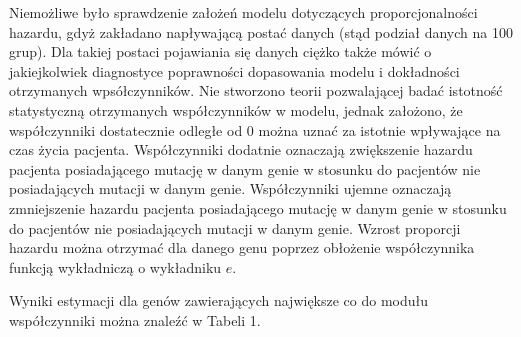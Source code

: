 \documentclass[]{article}
\begin{document}
Niemożliwe było sprawdzenie założeń modelu dotyczących proporcjonalności
hazardu, gdyż zakładano napływającą postać danych (stąd podział danych
na 100 grup). Dla takiej postaci pojawiania się danych ciężko także
mówić o jakiejkolwiek diagnostyce poprawności dopasowania modelu i
dokładności otrzymanych wpsółczynników. Nie stworzono teorii
pozwalającej badać istotność statystyczną otrzymanych współczynników w
modelu, jednak założono, że współczynniki dostatecznie odległe od \(0\)
można uznać za istotnie wpływające na czas życia pacjenta. Współczynniki
dodatnie oznaczają zwiększenie hazardu pacjenta posiadającego mutację w
danym genie w stosunku do pacjentów nie posiadających mutacji w danym
genie. Współczynniki ujemne oznaczają zmniejszenie hazardu pacjenta
posiadającego mutację w danym genie w stosunku do pacjentów nie
posiadających mutacji w danym genie. Wzrost proporcji hazardu można
otrzymać dla danego genu poprzez obłożenie współczynnika funkcją
wykładniczą o wykładniku \(e\).

Wyniki estymacji dla genów zawierających największe co do modułu
współczynniki można znaleźć w Tabeli 1.

\newpage
\end{document}
